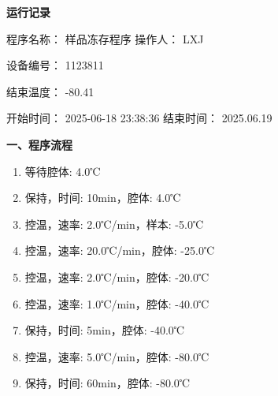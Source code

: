 \documentclass[UTF8,10pt,a4paper,fontset=fandol]{ctexart}
\newcommand{\fieldvalue}[1]{#1}
\newcommand{\handwritten}[1]{#1}
\begin{document}
\begin{center}
\end{center}

\newpage

\begin{center}
\textbf{\large 运行记录}
\end{center}

\noindent
程序名称：
\fieldvalue{样品冻存程序}
\hspace{2cm}
操作人：
\fieldvalue{LXJ}

\noindent
设备编号：
\fieldvalue{\handwritten{1123811}}

\noindent
结束温度：
\fieldvalue{\handwritten{-80.41}}

\noindent
开始时间：
\fieldvalue{2025-06-18 23:38:36}
\hspace{1cm}
结束时间：
\fieldvalue{\handwritten{2025.06.19}}

\bigskip

\noindent\textbf{一、程序流程}

\begin{enumerate}
  \item 等待腔体: 4.0℃
  \item 保持，时间: 10min，腔体: 4.0℃
  \item 控温，速率: 2.0℃/min，样本: -5.0℃
  \item 控温，速率: 20.0℃/min，腔体: -25.0℃
  \item 控温，速率: 2.0℃/min，腔体: -20.0℃
  \item 控温，速率: 1.0℃/min，腔体: -40.0℃
  \item 保持，时间: 5min，腔体: -40.0℃
  \item 控温，速率: 5.0℃/min，腔体: -80.0℃
  \item 保持，时间: 60min，腔体: -80.0℃
\end{enumerate}
\end{document}
